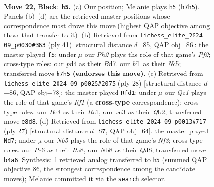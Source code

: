 \documentclass[11pt]{article}
\begin{document}
\clearpage

\begin{figure}[p]\centering
\begin{subfigure}{0.46\textwidth}\centering
\resizebox{\linewidth}{!}{%
\newchessgame
\chessboard[
  setfen={rnb1qrk1/1p5p/2p1p3/p2p1p2/1n1P1P2/2N2NP1/PPPQ1K1P/3R1B1R b - - 2 22},
  showmover=false,
  pgfstyle=straightmove, color=movearrow, markmove={h7-h5}
]}
\caption{}
\end{subfigure}\hfill
\begin{subfigure}{0.46\textwidth}\centering
\resizebox{\linewidth}{!}{%
\newchessgame
\chessboard[
  setfen={1r3rk1/3b1pp1/1q2p2p/2npP3/pn1N1P2/2N1Q2P/1PPRB1PK/5R2 b - - 1 21},
  showmover=false,
  pgfstyle=straightmove, color=movearrow, markmove={f7-f5}
]}
\caption{}
\end{subfigure}
\\[4pt]
\begin{subfigure}{0.46\textwidth}\centering
\resizebox{\linewidth}{!}{%
\newchessgame
\chessboard[
  setfen={r2qr1k1/1pp2ppp/2npb3/pNn5/2P5/1P3NP1/PQ2PPBP/2R2RK1 w - - 1 15},
  showmover=false,
  pgfstyle=straightmove, color=movearrow, markmove={f1-d1}
]}
\caption{}
\end{subfigure}\hfill
\begin{subfigure}{0.46\textwidth}\centering
\resizebox{\linewidth}{!}{%
\newchessgame
\chessboard[
  setfen={r2q1rk1/4ppbp/2pp1np1/p7/Pn1NP3/2N1BP2/1PP3PP/R2Q1RK1 b - - 1 14},
  showmover=false,
  pgfstyle=straightmove, color=movearrow, markmove={f6-d7}
]}
\caption{}
\end{subfigure}
\caption{\textbf{Move 22, Black: \texttt{h5}.} (a) Our position; Melanie plays \texttt{h5} (\texttt{h7h5}). Panels (b)--(d) are the retrieved master positions whose correspondence most drove this move (highest QAP objective among those that transfer to it). (b) Retrieved from \texttt{lichess\_elite\_2024-09\_p0030\#363} (ply 41) [structural distance $d$=85, QAP obj=86]: the master played \texttt{f5}; under $\mu$ our \emph{Ph2} plays the role of that game's \emph{Pf2}; cross-type roles: our \emph{p}d4 as their \emph{B}d7, our \emph{b}f1 as their \emph{N}c5; transferred move \texttt{h7h5} \textbf{(endorses this move)}. (c) Retrieved from \texttt{lichess\_elite\_2024-09\_p0025\#2075} (ply 28) [structural distance $d$=86, QAP obj=78]: the master played \texttt{Rfd1}; under $\mu$ our \emph{Qe1} plays the role of that game's \emph{Rf1} (a \textbf{cross-type} correspondence); cross-type roles: our \emph{B}c8 as their \emph{R}c1, our \emph{n}c3 as their \emph{Q}b2; transferred move \texttt{e8d8}. (d) Retrieved from \texttt{lichess\_elite\_2024-09\_p0013\#717} (ply 27) [structural distance $d$=87, QAP obj=64]: the master played \texttt{Nd7}; under $\mu$ our \emph{Nb5} plays the role of that game's \emph{Nf3}; cross-type roles: our \emph{P}e6 as their \emph{R}a8, our \emph{N}b8 as their \emph{Q}d8; transferred move \texttt{b4a6}. Synthesis: 1 retrieved analog transferred to \texttt{h5} (summed QAP objective 86, the strongest correspondence among the candidate moves); Melanie committed it via the \texttt{search} selector.}
\label{fig:thought-m43}
\end{figure}
\end{document}
